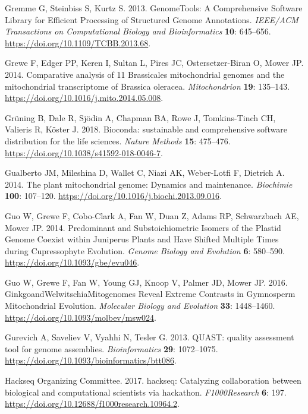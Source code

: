 \documentclass[
  12pt,
  oneside,
  openany]{book}
\begin{document}
\leavevmode\hypertarget{ref-Gremme_2013}{}%
Gremme G, Steinbiss S, Kurtz S. 2013. GenomeTools: A Comprehensive Software Library for Efficient Processing of Structured Genome Annotations. \emph{IEEE/ACM Transactions on Computational Biology and Bioinformatics} \textbf{10}: 645--656. \url{https://doi.org/10.1109/TCBB.2013.68}.

\leavevmode\hypertarget{ref-Grewe_2014}{}%
Grewe F, Edger PP, Keren I, Sultan L, Pires JC, Ostersetzer-Biran O, Mower JP. 2014. Comparative analysis of 11 Brassicales mitochondrial genomes and the mitochondrial transcriptome of Brassica oleracea. \emph{Mitochondrion} \textbf{19}: 135--143. \url{https://doi.org/10.1016/j.mito.2014.05.008}.

\leavevmode\hypertarget{ref-Gr_ning_2018}{}%
Grüning B, Dale R, Sjödin A, Chapman BA, Rowe J, Tomkins-Tinch CH, Valieris R, Köster J. 2018. Bioconda: sustainable and comprehensive software distribution for the life sciences. \emph{Nature Methods} \textbf{15}: 475--476. \url{https://doi.org/10.1038/s41592-018-0046-7}.

\leavevmode\hypertarget{ref-Gualberto_2014}{}%
Gualberto JM, Mileshina D, Wallet C, Niazi AK, Weber-Lotfi F, Dietrich A. 2014. The plant mitochondrial genome: Dynamics and maintenance. \emph{Biochimie} \textbf{100}: 107--120. \url{https://doi.org/10.1016/j.biochi.2013.09.016}.

\leavevmode\hypertarget{ref-Guo_2014}{}%
Guo W, Grewe F, Cobo-Clark A, Fan W, Duan Z, Adams RP, Schwarzbach AE, Mower JP. 2014. Predominant and Substoichiometric Isomers of the Plastid Genome Coexist within Juniperus Plants and Have Shifted Multiple Times during Cupressophyte Evolution. \emph{Genome Biology and Evolution} \textbf{6}: 580--590. \url{https://doi.org/10.1093/gbe/evu046}.

\leavevmode\hypertarget{ref-Guo_2016}{}%
Guo W, Grewe F, Fan W, Young GJ, Knoop V, Palmer JD, Mower JP. 2016. GinkgoandWelwitschiaMitogenomes Reveal Extreme Contrasts in Gymnosperm Mitochondrial Evolution. \emph{Molecular Biology and Evolution} \textbf{33}: 1448--1460. \url{https://doi.org/10.1093/molbev/msw024}.

\leavevmode\hypertarget{ref-Gurevich_2013}{}%
Gurevich A, Saveliev V, Vyahhi N, Tesler G. 2013. QUAST: quality assessment tool for genome assemblies. \emph{Bioinformatics} \textbf{29}: 1072--1075. \url{https://doi.org/10.1093/bioinformatics/btt086}.

\leavevmode\hypertarget{ref-Hackseq_2017}{}%
Hackseq Organizing Committee. 2017. hackseq: Catalyzing collaboration between biological and computational scientists via hackathon. \emph{F1000Research} \textbf{6}: 197. \url{https://doi.org/10.12688/f1000research.10964.2}.
\end{document}
